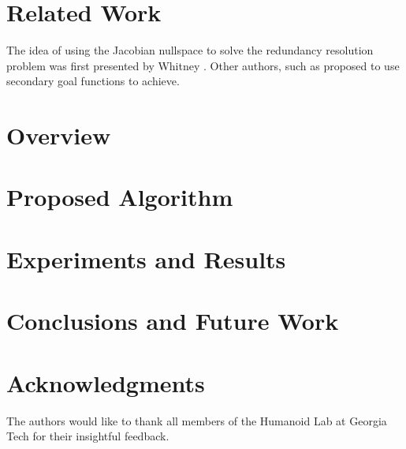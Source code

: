 \documentclass[conference]{IEEEtran}
\begin{document}
 

\section{Related Work}
\label{sec:RelatedWork}
The idea of using the Jacobian nullspace to solve the redundancy 
resolution problem was first presented by Whitney \cite{Whitney-motionRate-1969}.
Other authors, such as \cite{liegeois-ns-1977} proposed to use
secondary goal functions to achieve.

\section{Overview}
\label{sec:Overview}

\section{Proposed Algorithm}
\label{sec:ProposedAlgorithm}


\section{Experiments and Results}
\label{sec:Experiments}


\section{Conclusions and Future Work}
\label{sec:Conclusions}


\section*{Acknowledgments}
The authors would like to thank all members of the Humanoid Lab
at Georgia Tech for their insightful feedback.



\end{document}
